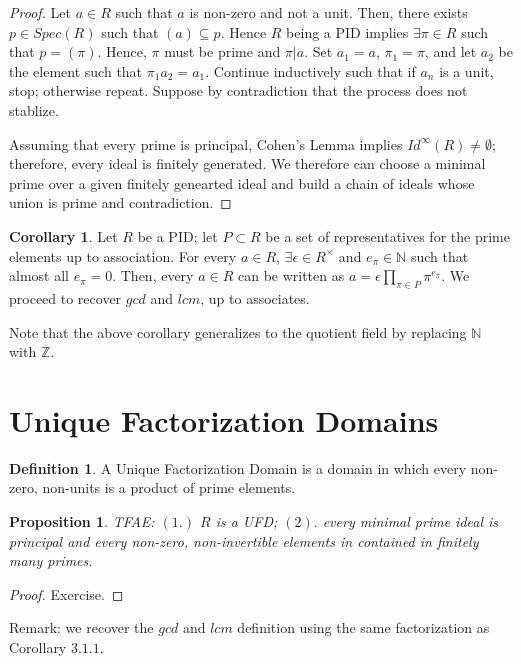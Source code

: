 \documentclass{article}
\newtheorem{proposition}{Proposition}[section]
\theoremstyle{definition}
\newtheorem{definition}{Definition}[section]
\newtheorem{corollary}{Corollary}[theorem]
\theoremstyle{definition}
\begin{document}
\begin{proof}
    Let $a\in R$ such that $a$ is non-zero and not a unit. Then, there exists $p\in Spec(R)$ such that $(a)\subseteq p$. Hence $R$ being a PID implies $\exists \pi\in R $ such that $p=(\pi)$. Hence, $\pi$ must be prime and $\pi|a$. Set $a_1=a$, $\pi_1=\pi$, and let $a_2$ be the element such that $\pi_1a_2=a_1$. Continue inductively such that if $a_n$ is a unit, stop; otherwise repeat. Suppose by contradiction that the process does not stablize.

    Assuming that every prime is principal, Cohen's Lemma implies $Id^{\infty}(R)\neq \emptyset$; therefore, every ideal is finitely generated. We therefore can choose a minimal prime over a given finitely genearted ideal and build a chain of ideals whose union is prime and contradiction. 
\end{proof}
\begin{corollary}
    Let $R$ be a PID; let $P\subset R$ be a set of representatives for the prime elements up to association. For every $a\in R$, $\exists \epsilon\in R^{\times} $ and $e_{\pi}\in \mathbb{N} $ such that almost all $e_{\pi}=0$. Then, every $a\in R$ can be written as $a=\epsilon\prod_{\pi\in P}\pi^{e_{\pi}}$. We proceed to recover $gcd$ and $lcm$, up to associates. 
\end{corollary}
Note that the above corollary generalizes to the quotient field by replacing $\mathbb{N}$ with $\mathbb{Z}$.

\section{Unique Factorization Domains}
\begin{definition}
    A Unique Factorization Domain is a domain in which every non-zero, non-units is a product of prime elements. 
\end{definition}
\begin{proposition}
    TFAE: $(1.)$ $R$ is a UFD; $(2).$ every minimal prime ideal is principal and every non-zero, non-invertible elements in contained in finitely many primes. 
\end{proposition}
\begin{proof}
    Exercise. 
\end{proof}
Remark: we recover the $gcd$ and $lcm$ definition using the same factorization as Corollary $3.1.1$.
\end{document}
